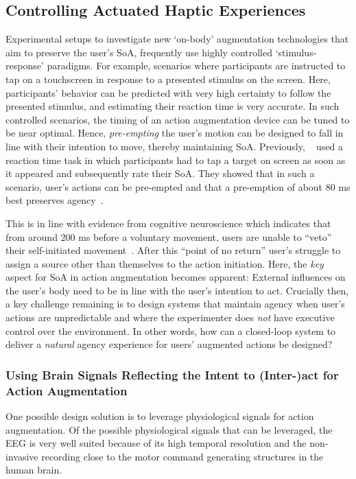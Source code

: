 \subsection{Controlling Actuated Haptic Experiences}

Experimental setups to investigate new `on-body' augmentation technologies that aim to preserve the user's SoA, frequently use highly controlled `stimulus-response' paradigms. For example, scenarios where participants are instructed to tap on a touchscreen in response to a presented stimulus on the screen. Here, participants' behavior can be predicted with very high certainty to follow the presented stimulus, and estimating their reaction time is very accurate. In such controlled scenarios, the timing of an action augmentation device can be tuned to be near optimal. Hence, \textit{pre-empting} the user's motion can be designed to fall in line with their intention to move, thereby maintaining SoA. Previously, ~\citet{Kasahara2019-sk} used a reaction time task in which participants had to tap a target on screen as soon as it appeared and subsequently rate their SoA. They showed that in such a scenario, user's actions can be pre-empted and that a pre-emption of about 80 ms best preserves agency~\cite{Kasahara2019-sk, Kasahara2021-gy}. 

This is in line with evidence from cognitive neuroscience which indicates that from around 200 ms before a voluntary movement, users are unable to ``veto'' their self-initiated movement~\cite{Schultze-Kraft2016-bx}. After this ``point of no return'' user's struggle to assign a source other than themselves to the action initiation. Here, the \textit{key} aspect for SoA in action augmentation becomes apparent: External influences on the user's body need to be in line with the user's intention to act. Crucially then, a key challenge remaining is to design systems that maintain agency when user's actions are unpredictable and where the experimenter does \textit{not} have executive control over the environment. In other words, how can a closed-loop system to deliver a \textit{natural} agency experience for users' augmented actions be designed?

\subsubsection{Using Brain Signals Reflecting the Intent to (Inter-)act for Action Augmentation}
One possible design solution is to leverage physiological signals for action augmentation. Of the possible physiological signals that can be leveraged, the EEG is very well suited because of its high temporal resolution and the non-invasive recording close to the motor command generating structures in the human brain. 

